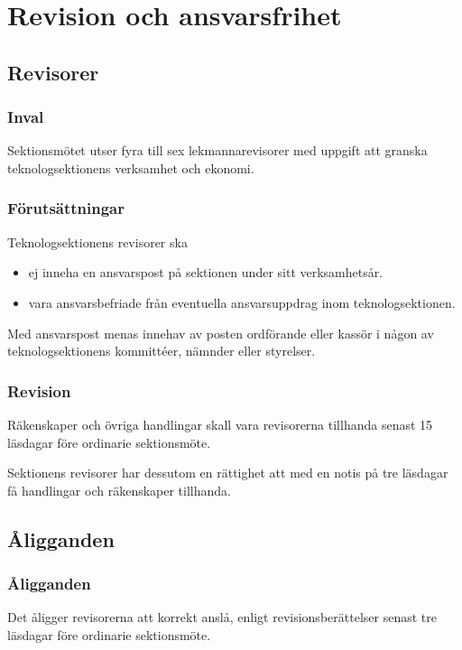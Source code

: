 \section{Revision och ansvarsfrihet}

\subsection{Revisorer}

\subsubsection{Inval}
Sektionsmötet utser fyra till sex lekmannarevisorer med uppgift att granska teknologsektionens verksamhet och ekonomi.

\subsubsection{Förutsättningar}
Teknologsektionens revisorer ska 
\begin{itemize}
    \item ej inneha en ansvarspost på sektionen under sitt verksamhetsår.
    \item vara ansvarsbefriade från eventuella ansvarsuppdrag inom teknologsektionen. 
\end{itemize} 

Med ansvarspost menas innehav av posten ordförande eller kassör i någon av teknologsektionens kommittéer, nämnder eller styrelser.

\subsubsection{Revision}
Räkenskaper och övriga handlingar skall vara revisorerna tillhanda senast 15 läsdagar före ordinarie sektionsmöte. 

Sektionens revisorer har dessutom en rättighet att med en notis på tre läsdagar få handlingar och räkenskaper tillhanda. 

\subsection{Åligganden}

\subsubsection{Åligganden}
Det åligger revisorerna att korrekt anslå, enligt  revisionsberättelser senast tre läsdagar före ordinarie sektionsmöte.

